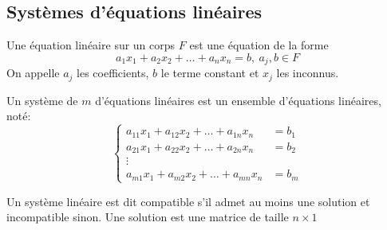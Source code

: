 \subsection{Systèmes d'équations linéaires}
\begin{definition}
    Une équation linéaire sur un corps $F$ est une équation de la forme 
    \[ a_1x_1 + a_2x_2 + \ldots + a_nx_n = b, \ a_j, b \in F \]
    On appelle $a_j$ les coefficients, $b$ le terme constant et $x_j$ les inconnus.
\end{definition}
\begin{definition}
    Un système de $m$ d'équations linéaires est un ensemble d'équations linéaires, noté:
    \[ \begin{cases}
            a_{11}x_1 + a_{12}x_2 + \ldots + a_{1n}x_n & = b_1 \\
            a_{21}x_1 + a_{22}x_2 + \ldots + a_{2n}x_n & = b_2 \\
            \vdots                                             \\
            a_{m1}x_1 + a_{m2}x_2 + \ldots + a_{mn}x_n & = b_m
        \end{cases} \]
\end{definition}
\begin{definition}
    Un système linéaire est dit compatible s'il admet au moins une solution et incompatible sinon. Une solution est une matrice de taille $n \times 1$
\end{definition}
